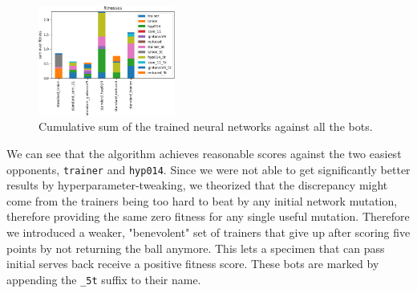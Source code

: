 \documentclass[11pt,a4paper]{scrartcl}
\begin{document}
\begin{figure}[H]
\center
\includegraphics[width=0.4\textwidth]{img/standard.png}
\caption{Cumulative sum of the trained neural networks against all the bots.}
\label{fig:standard_c}
\end{figure}

We can see that the algorithm achieves reasonable scores against the two easiest opponents, \texttt{trainer} and \texttt{hyp014}. Since we were not able to get significantly better results by hyperparameter-tweaking, we theorized that the discrepancy might come from the trainers being too hard to beat by any initial network mutation, therefore providing the same zero fitness for any single useful mutation. Therefore we introduced a weaker, "benevolent" set of trainers that give up after scoring five points by not returning the ball anymore. This lets a specimen that can pass initial serves back receive a positive fitness score. These bots are marked by appending the \texttt{\_5t} suffix to their name.
\end{document}
